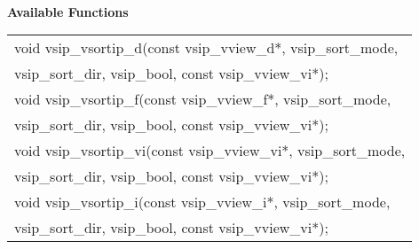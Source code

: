 \\\cvsiplh
\newline \hspace*{.8cm} \vspace*{.1cm} \textbf{Available Functions }
\newline \hspace*{1.1cm} {
\ttfamily
\begin{tabular}[H]{l}
void vsip\_vsortip\_d(const vsip\_vview\_d*, vsip\_sort\_mode,\\*\hspace*{1cm}vsip\_sort\_dir, vsip\_bool, const vsip\_vview\_vi*);\\
void vsip\_vsortip\_f(const vsip\_vview\_f*, vsip\_sort\_mode,\\*\hspace*{1cm}vsip\_sort\_dir, vsip\_bool, const vsip\_vview\_vi*);\\
void vsip\_vsortip\_vi(const vsip\_vview\_vi*, vsip\_sort\_mode,\\*\hspace*{1cm}vsip\_sort\_dir, vsip\_bool, const vsip\_vview\_vi*);\\
void vsip\_vsortip\_i(const vsip\_vview\_i*, vsip\_sort\_mode,\\*\hspace*{1cm}vsip\_sort\_dir, vsip\_bool, const vsip\_vview\_vi*);\\
\end{tabular}
}\\
\pyjvsiph
{}
